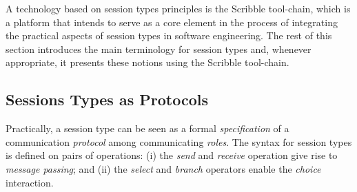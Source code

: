 
A technology based on session types principles is the Scribble tool-chain, which
is a platform that intends to serve as a core element in the process
of integrating the practical aspects of session types
in software engineering.
The rest of this
section introduces the main terminology for session types
and, whenever appropriate, it presents these notions
using the Scribble tool-chain.



\subsection{Sessions Types as Protocols}%
\label{sec:sessions_scribble}


Practically, a session type can be seen as a formal
{\em specification} of a communication {\em protocol} among communicating {\em roles}.
The syntax for session types is defined on pairs of operations:
(i) the {\em send} and {\em receive} operation give rise to
{\em message passing}; and
(ii) the {\em select} and {\em branch} operators enable the
{\em choice} interaction.

